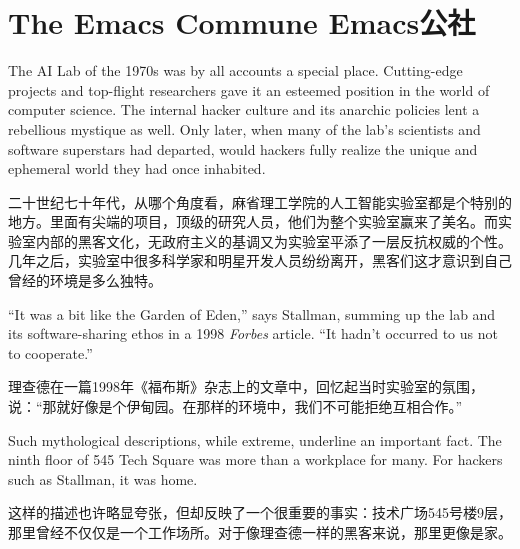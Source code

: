 \chapter{\ifdefined\eng
The Emacs Commune
\fi
\ifdefined\chs
Emacs公社
\fi
}

\ifdefined\eng
The AI Lab of the 1970s was by all accounts a special place. Cutting-edge projects and top-flight researchers gave it an esteemed position in the world of computer science. The internal hacker culture and its anarchic policies lent a rebellious mystique as well. Only later, when many of the lab's scientists and software superstars had departed, would hackers fully realize the unique and ephemeral world they had once inhabited.
\fi

\ifdefined\chs
二十世纪七十年代，从哪个角度看，麻省理工学院的人工智能实验室都是个特别的地方。里面有尖端的项目，顶级的研究人员，他们为整个实验室赢来了美名。而实验室内部的黑客文化，无政府主义的基调又为实验室平添了一层反抗权威的个性。几年之后，实验室中很多科学家和明星开发人员纷纷离开，黑客们这才意识到自己曾经的环境是多么独特。
\fi

\ifdefined\eng
``It was a bit like the Garden of Eden,'' says Stallman, summing up the lab and its software-sharing ethos in a 1998 \textit{Forbes} article. ``It hadn't occurred to us not to cooperate.''
\fi

\ifdefined\chs
理查德在一篇1998年《福布斯》杂志上的文章中，回忆起当时实验室的氛围，说：“那就好像是个伊甸园。在那样的环境中，我们不可能拒绝互相合作。”
\fi

\ifdefined\eng
Such mythological descriptions, while extreme, underline an important fact. The ninth floor of 545 Tech Square was more than a workplace for many. For hackers such as Stallman, it was home.
\fi

\ifdefined\chs
这样的描述也许略显夸张，但却反映了一个很重要的事实：技术广场545号楼9层，那里曾经不仅仅是一个工作场所。对于像理查德一样的黑客来说，那里更像是家。
\fi

